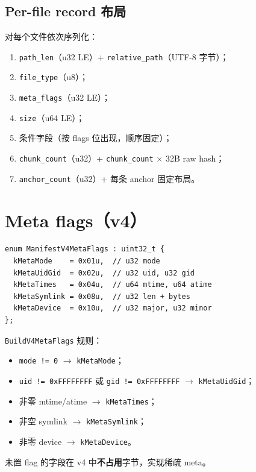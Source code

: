 \subsection{Per-file record 布局}

对每个文件依次序列化：

\begin{enumerate}
  \item \texttt{path\_len}（u32 LE）+ \texttt{relative\_path}（UTF-8 字节）；
  \item \texttt{file\_type}（u8）；
  \item \texttt{meta\_flags}（u32 LE）；
  \item \texttt{size}（u64 LE）；
  \item 条件字段（按 flags 位出现，顺序固定）；
  \item \texttt{chunk\_count}（u32）+ \texttt{chunk\_count} $\times$ 32B raw hash；
  \item \texttt{anchor\_count}（u32）+ 每条 anchor 固定布局。
\end{enumerate}

\section{Meta flags（v4）}

\begin{lstlisting}[caption={ManifestV4MetaFlags},label={lst:v4-meta-flags}]
enum ManifestV4MetaFlags : uint32_t {
  kMetaMode    = 0x01u,  // u32 mode
  kMetaUidGid  = 0x02u,  // u32 uid, u32 gid
  kMetaTimes   = 0x04u,  // u64 mtime, u64 atime
  kMetaSymlink = 0x08u,  // u32 len + bytes
  kMetaDevice  = 0x10u,  // u32 major, u32 minor
};
\end{lstlisting}

\texttt{BuildV4MetaFlags} 规则：
\begin{itemize}[nosep]
  \item \texttt{mode != 0} $\rightarrow$ \texttt{kMetaMode}；
  \item \texttt{uid != 0xFFFFFFFF} 或 \texttt{gid != 0xFFFFFFFF} $\rightarrow$ \texttt{kMetaUidGid}；
  \item 非零 mtime/atime $\rightarrow$ \texttt{kMetaTimes}；
  \item 非空 symlink $\rightarrow$ \texttt{kMetaSymlink}；
  \item 非零 device $\rightarrow$ \texttt{kMetaDevice}。
\end{itemize}

未置 flag 的字段在 v4 中\textbf{不占用}字节，实现稀疏 meta。

